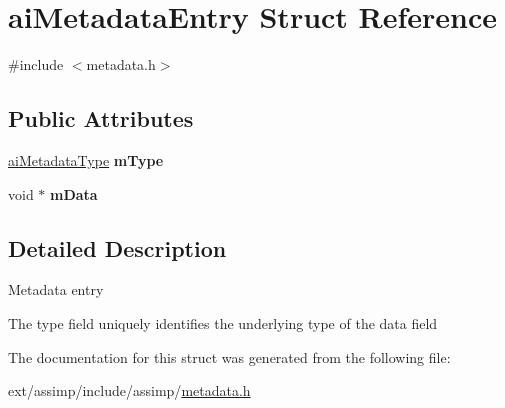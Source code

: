 \hypertarget{structai_metadata_entry}{\section{ai\-Metadata\-Entry Struct Reference}
\label{structai_metadata_entry}
}


{\ttfamily \#include $<$metadata.\-h$>$}

\subsection*{Public Attributes}
\begin{DoxyCompactItemize}
\item 
\hypertarget{structai_metadata_entry_a075b29cd710e153f5402f479a7a10aee}{\hyperlink{metadata_8h_aa910906c37416da57bb36335a4d04232}{ai\-Metadata\-Type} {\bfseries m\-Type}}\label{structai_metadata_entry_a075b29cd710e153f5402f479a7a10aee}

\item 
\hypertarget{structai_metadata_entry_a97fe80a47846374edd38bda5b50b99b3}{void $\ast$ {\bfseries m\-Data}}\label{structai_metadata_entry_a97fe80a47846374edd38bda5b50b99b3}

\end{DoxyCompactItemize}


\subsection{Detailed Description}
Metadata entry

The type field uniquely identifies the underlying type of the data field 

The documentation for this struct was generated from the following file\-:\begin{DoxyCompactItemize}
\item 
ext/assimp/include/assimp/\hyperlink{metadata_8h}{metadata.\-h}\end{DoxyCompactItemize}
